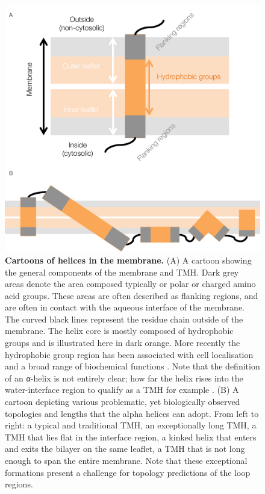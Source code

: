 \documentclass[12pt,PhD,twoside]{muthesis}
\begin{document}
\begin{figure}[h]
\centering
\includegraphics[width=1\textwidth]{Helix_anatomy}
\caption{\textbf{Cartoons of helices in the membrane.} (A) A cartoon showing the general components of the membrane and TMH. Dark grey areas denote the area composed typically or polar or charged amino acid groups. These areas are often described as flanking regions, and are often in contact with the aqueous interface of the membrane. The curved black lines represent the residue chain outside of the membrane. The helix core is mostly composed of hydrophobic groups and is illustrated here in dark orange. More recently the hydrophobic group region has been associated with cell localisation and a broad range of biochemical functions \cite{Junne2010, Wong2012}. Note that the definition of an α-helix is not entirely clear; how far the helix rises into the water-interface region to qualify as a TMH for example \cite{VonHeijne2006}. (B) A cartoon depicting various problematic, yet biologically observed topologies and lengths that the alpha helices can adopt. From left to right: a typical and traditional TMH, an exceptionally long TMH, a TMH that lies flat in the interface region, a kinked helix that enters and exits the bilayer on the same leaflet, a TMH that is not long enough to span the entire membrane. Note that these exceptional formations present a challenge for topology predictions of the loop regions.}
\end{figure}
\end{document}

